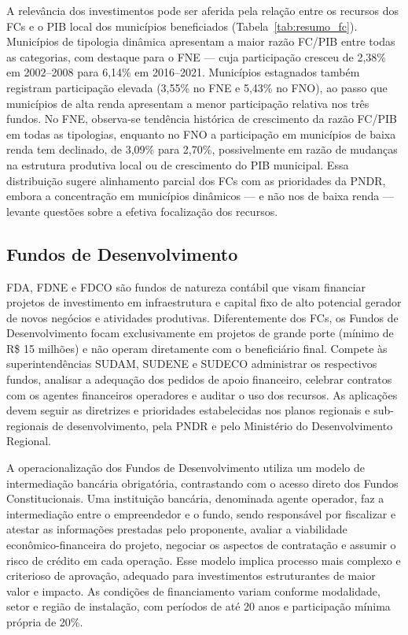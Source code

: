 A relevância dos investimentos pode ser aferida pela relação entre os recursos dos FCs e o PIB local dos municípios beneficiados (Tabela~\ref{tab:resumo_fc}). Municípios de tipologia dinâmica apresentam a maior razão FC/PIB entre todas as categorias, com destaque para o FNE --- cuja participação cresceu de 2,38\% em 2002--2008 para 6,14\% em 2016--2021. Municípios estagnados também registram participação elevada (3,55\% no FNE e 5,43\% no FNO), ao passo que municípios de alta renda apresentam a menor participação relativa nos três fundos. No FNE, observa-se tendência histórica de crescimento da razão FC/PIB em todas as tipologias, enquanto no FNO a participação em municípios de baixa renda tem declinado, de 3,09\% para 2,70\%, possivelmente em razão de mudanças na estrutura produtiva local ou de crescimento do PIB municipal. Essa distribuição sugere alinhamento parcial dos FCs com as prioridades da PNDR, embora a concentração em municípios dinâmicos --- e não nos de baixa renda --- levante questões sobre a efetiva focalização dos recursos.

\subsection{Fundos de Desenvolvimento}
\label{subsec:fds}

FDA, FDNE e FDCO são fundos de natureza contábil que visam financiar projetos de investimento em infraestrutura e capital fixo de alto potencial gerador de novos negócios e atividades produtivas. Diferentemente dos FCs, os Fundos de Desenvolvimento focam exclusivamente em projetos de grande porte (mínimo de R\$ 15 milhões) e não operam diretamente com o beneficiário final. Compete às superintendências SUDAM, SUDENE e SUDECO administrar os respectivos fundos, analisar a adequação dos pedidos de apoio financeiro, celebrar contratos com os agentes financeiros operadores e auditar o uso dos recursos. As aplicações devem seguir as diretrizes e prioridades estabelecidas nos planos regionais e sub-regionais de desenvolvimento, pela PNDR e pelo Ministério do Desenvolvimento Regional.

A operacionalização dos Fundos de Desenvolvimento utiliza um modelo de intermediação bancária obrigatória, contrastando com o acesso direto dos Fundos Constitucionais. Uma instituição bancária, denominada agente operador, faz a intermediação entre o empreendedor e o fundo, sendo responsável por fiscalizar e atestar as informações prestadas pelo proponente, avaliar a viabilidade econômico-financeira do projeto, negociar os aspectos de contratação e assumir o risco de crédito em cada operação. Esse modelo implica processo mais complexo e criterioso de aprovação, adequado para investimentos estruturantes de maior valor e impacto. As condições de financiamento variam conforme modalidade, setor e região de instalação, com períodos de até 20 anos e participação mínima própria de 20\%.

